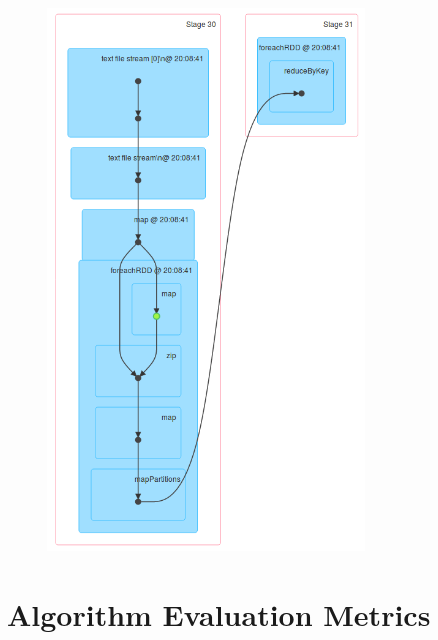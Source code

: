 \documentclass{l4proj}
\begin{document}
\begin{appendices}
\begin{figure}[H]
	\centering
    \label{fig:dag8}
    \includegraphics[width=0.75\textwidth]{images/DAG8}
\end{figure}

\chapter{Algorithm Evaluation Metrics}


\end{appendices}
\end{document}
